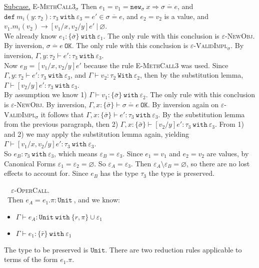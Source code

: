 \documentclass{llncs}
\newcommand{\keywadj}[1]{\mathtt{#1}}
\newcommand{\keyw}[1]{\keywadj{#1}~}
\newcommand{\proofcase}[2]{
	\begin{adjustwidth}{1.5em}{0pt}
		\fbox{Case.}~~#1. \\ ~#2
	\end{adjustwidth}
}
\newcommand{\subcase}[1] {
	\begin{adjustwidth}{2.2em}{0pt}
		\underline{Subcase.} #1
	\end{adjustwidth}
}
\newcommand{\type}[2]{
	#1~\keyw{with} #2
}
\newcommand{\newsig}[0]{
	\keywadj{new}_\sigma~x \Rightarrow \overline{\sigma = e}
}
\begin{document}
{{		\subcase{ \textsc{E-MethCall3$_\sigma$} Then $e_1 = v_1 = \newsig$, and $\keyw{def} m_i(y : \tau_2) : \tau_3~\keyw{with} \varepsilon_3 = e' \in \overline{\sigma = e}$, and $e_2 = v_2$ is a value, and $v_1.m_i(v_2) \longrightarrow [v_1/x, v_2/y]e'~|~\varnothing$. \\
	
	\noindent	
We already know $e_1  : \{ \overline \sigma \}~ \keyw{with} \varepsilon_1$. The only rule with this conclusion is \textsc{$\varepsilon$-NewObj}. By inversion, $\overline{ \sigma = e }~\keywadj{OK}$. The only rule with this conclusion is \textsc{$\varepsilon$-ValidImpl$_{\sigma}$}. By inversion, $\Gamma, y : \tau_2 \vdash e' : \tau_3~\keyw{with} \varepsilon_3$. \\

		\noindent
Now $e_B = [v_1/x, v_2/y]e'$ because the rule \textsc{E-MethCall3} was used. Since $\Gamma, y : \tau_2 \vdash e' : \tau_3~\keyw{with} \varepsilon_3$, and $\Gamma \vdash v_2 : \tau_2~\keyw{With} \varepsilon_2$, then by the substitution lemma, $\Gamma \vdash [v_2/y]e' : \tau_3~\keyw{with} \varepsilon_3$.  \\

\noindent
By assumption we know 1) $\Gamma \vdash v_1 : \type{\{ \bar \sigma \}}{\varepsilon_2}$. The only rule with this conclusion is \textsc{$\varepsilon$-NewObj}. By inversion, $\Gamma, x : \{ \bar \sigma \} \vdash \overline{\sigma = e}~\keywadj{OK}$. By inversion again on \textsc{$\varepsilon$-ValidImpl$_\sigma$} it follows that $\Gamma, x : \{ \bar \sigma \} \vdash e' : \tau_3~\keyw{with} \varepsilon_3$. By the substitution lemma from the previous paragraph, then 2) $\Gamma, x : \{ \bar \sigma \} \vdash [v_2/y]e' : \tau_3~\keyw{with} \varepsilon_3$. From 1) and 2) we may apply the substitution lemma again, yielding $\Gamma \vdash [v_1/x, v_2/y]e' : \tau_3~\keyw{with} \varepsilon_3$.\\

	\noindent
So $e_B : \tau_3~\keyw{with} \varepsilon_3$, which means $\varepsilon_B = \varepsilon_3$. Since $e_1 = v_1$ and $e_2 = v_2$ are values, by Canonical Forms $\varepsilon_1 = \varepsilon_2 = \varnothing$. So $\varepsilon_A = \varepsilon_3$. Then $\varepsilon_A \setminus \varepsilon_B = \varnothing$, so there are no lost effects to account for. Since $e_B$ has the type $\tau_3$ the type is preserved.
\\ }
}


	\proofcase{\textsc{$\varepsilon$-OperCall}} {Then $e_A = e_1.\pi : \keyw{Unit}$, and we know:
	\begin{itemize}
		\item $\Gamma \vdash e_A :  \keyw{Unit~with} \{ r, \pi \} \cup \varepsilon_1$
		\item $\Gamma \vdash e_1 : \{ \bar r \}~\keyw{with} \varepsilon_1$
	\end{itemize}
The type to be preserved is $\keywadj{Unit}$. There are two reduction rules applicable to terms of the form $e_1.\pi$. 

}}
\end{document}
